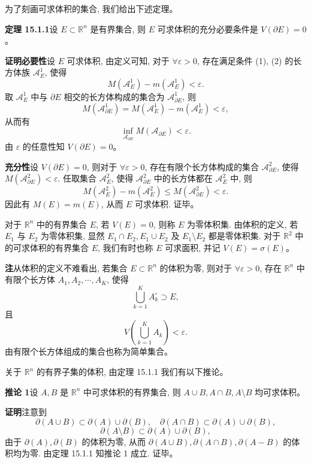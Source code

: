 \documentclass[UTF8,12pt,a4paper,fontset=fandol]{ctexart}
\begin{document}
为了刻画可求体积的集合, 我们给出下述定理。

\noindent\textbf{定理 15.1.1}\quad 设 $E\subset\mathbb R^n$ 是有界集合, 则 $E$ 可求体积的充分必要条件是 $V(\partial E)=0$。

\noindent\textbf{证明}\quad \textbf{必要性}\quad 设 $E$ 可求体积, 由定义可知, 对于 $\forall\varepsilon>0$, 存在满足条件 (1), (2) 的长方体族 $\mathcal A_E^1$, 使得
\[
  M(\mathcal A_E^1)-m(\mathcal A_E^1)<\varepsilon.
\]
取 $\mathcal A_E^1$ 中与 $\partial E$ 相交的长方体构成的集合为 $\mathcal A_{\partial E}^1$, 则
\[
  M(\mathcal A_{\partial E}^1)=M(\mathcal A_E^1)-m(\mathcal A_E^1)<\varepsilon,
\]
从而有
\[
  \inf_{\mathcal A_{\partial E}}M(\mathcal A_{\partial E})<\varepsilon.
\]
由 $\varepsilon$ 的任意性知 $V(\partial E)=0$。

\textbf{充分性}\quad 设 $V(\partial E)=0$, 则对于 $\forall\varepsilon>0$, 存在有限个长方体构成的集合 $\mathcal A_{\partial E}^2$, 使得 $M(\mathcal A_{\partial E}^2)<\varepsilon$. 任取集合 $\mathcal A_E^2$, 使得 $\mathcal A_{\partial E}^2$ 中的长方体都在 $\mathcal A_E^2$ 中, 则
\[
  M(\mathcal A_E^2)-m(\mathcal A_E^2)\leqslant M(\mathcal A_{\partial E}^2)<\varepsilon.
\]
因此有 $M(E)=m(E)$, 从而 $E$ 可求体积. 证毕。

对于 $\mathbb R^n$ 中的有界集合 $E$, 若 $V(E)=0$, 则称 $E$ 为零体积集. 由体积的定义, 若 $E_1$ 与 $E_2$ 为零体积集, 显然 $E_1\cap E_2,E_1\cup E_2$ 及 $E_1\setminus E_2$ 都是零体积集. 对于 $\mathbb R^2$ 中的可求体积的有界集合 $E$, 我们有时也称 $E$ 可求面积, 并记 $V(E)=\sigma(E)$。

\noindent\textbf{注}\quad 从体积的定义不难看出, 若集合 $E\subset\mathbb R^n$ 的体积为零, 则对于 $\forall\varepsilon>0$, 存在 $\mathbb R^n$ 中有限个长方体 $A_1,A_2,\cdots,A_K$, 使得
\[
  \bigcup_{k=1}^K A_k^\circ\supset E,
\]
且
\[
  V\left(\bigcup_{k=1}^K A_k\right)<\varepsilon.
\]
由有限个长方体组成的集合也称为简单集合。

关于 $\mathbb R^n$ 的有界子集的体积, 由定理 15.1.1 我们有以下推论。

\noindent\textbf{推论 1}\quad 设 $A,B$ 是 $\mathbb R^n$ 中可求体积的有界集合, 则 $A\cup B,A\cap B,A\setminus B$ 均可求体积。

\noindent\textbf{证明}\quad 注意到
\[
  \partial(A\cup B)\subset\partial(A)\cup\partial(B),\quad
  \partial(A\cap B)\subset\partial(A)\cup\partial(B),
\]
\[
  \partial(A\setminus B)\subset\partial(A)\cup\partial(B),
\]
由于 $\partial(A),\partial(B)$ 的体积为零, 从而 $\partial(A\cup B),\partial(A\cap B),\partial(A-B)$ 的体积均为零. 由定理 15.1.1 知推论 1 成立. 证毕。
\end{document}

